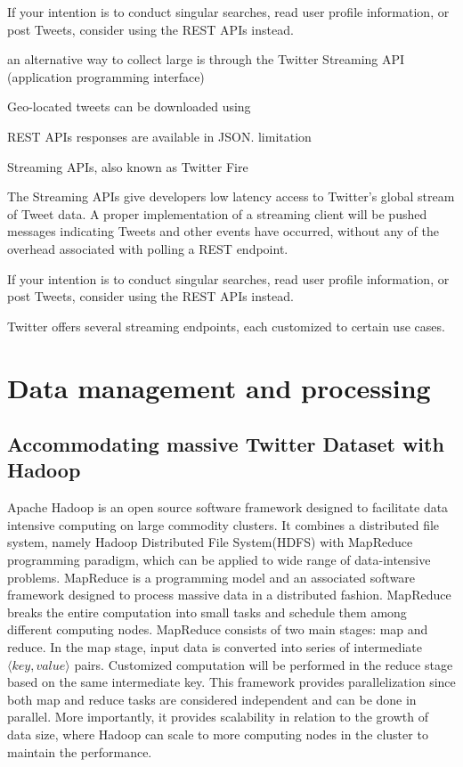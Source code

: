 \documentclass[a4paper,11pt]{article}
\begin{document}
If your intention is to conduct singular searches, read user profile information, or post Tweets, consider using the REST APIs instead.

an alternative way to collect large is through the Twitter Streaming API (application programming interface)

Geo-located tweets can be downloaded using 

REST APIs responses are available in JSON.
limitation


Streaming APIs, also known as Twitter Fire 

The Streaming APIs give developers low latency access to Twitter’s global stream of Tweet data. 
A proper implementation of a streaming client will be pushed messages indicating Tweets and other events have occurred, without any of the overhead associated with polling a REST endpoint.


If your intention is to conduct singular searches, read user profile information, or post Tweets, consider using the REST APIs instead.

Twitter offers several streaming endpoints, each customized to certain use cases.


\section{Data management and processing}
\subsection{Accommodating massive Twitter Dataset with Hadoop}
Apache Hadoop is an open source software framework designed to facilitate data intensive computing on large commodity clusters.
It combines a distributed file system, namely Hadoop Distributed File System(HDFS) with MapReduce programming paradigm, which can be applied to wide range of data-intensive problems.
MapReduce is a programming model and an associated software framework designed to process massive data in a distributed fashion.
MapReduce breaks the entire computation into small tasks and schedule them among different computing nodes.
MapReduce consists of two main stages: map and reduce.
In the map stage, input data is converted into series of intermediate $\langle key, value\rangle$ pairs.
Customized computation will be performed in the reduce stage based on the same intermediate key.
This framework provides parallelization since both map and reduce tasks are considered independent and can be done in parallel. More importantly, it provides scalability in relation to the growth of data size, where Hadoop can scale to more computing nodes in the cluster to maintain the performance.
\end{document}
